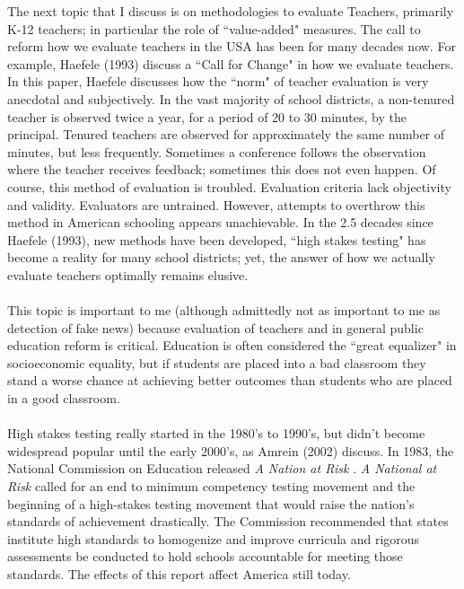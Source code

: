 \documentclass[12pt, final]{article}
\begin{document}
\label{Source 2}
The next topic that I discuss is on methodologies to evaluate Teachers, primarily K-12 teachers; in particular the role of ``value-added" measures. The call to reform how we evaluate teachers in the USA has been for many decades now. For example, Haefele (1993) \cite{Haefele} discuss a ``Call for Change" in how we evaluate teachers. In this paper, Haefele discusses how the ``norm" of teacher evaluation is very anecdotal and subjectively. In the vast majority of school districts, a non-tenured teacher is observed twice a year, for a period of 20 to 30 minutes, by the principal. Tenured teachers are observed for approximately the same number of minutes, but less frequently. Sometimes a conference follows the observation where the teacher receives feedback; sometimes this does not even happen. Of course, this method of evaluation is troubled. Evaluation criteria lack objectivity and validity. Evaluators are untrained. However, attempts to overthrow this method in American schooling appears unachievable. In the 2.5 decades since Haefele (1993), new methods have been developed, ``high stakes testing" has become a reality for many school districts; yet, the answer of how we actually evaluate teachers optimally remains elusive. 
\\
\\
This topic is important to me (although admittedly not as important to me as detection of fake news) because evaluation of teachers and in general public education reform is critical. Education is often considered the ``great equalizer" in socioeconomic equality, but if students are placed into a bad classroom they stand a worse chance at achieving better outcomes than students who are placed in a good classroom.
\\
\\
High stakes testing really started in the 1980's to 1990's, but didn't become widespread popular until the early 2000's, as Amrein (2002) \cite{Amrein} discuss. In 1983, the National Commission on Education released \textit{A Nation at Risk} \cite{National}. \textit{A National at Risk} called for an end to minimum competency testing movement and the beginning of a high-stakes testing movement that would raise the nation's standards of achievement drastically. The Commission recommended that states institute high standards to homogenize and improve curricula and rigorous assessments be conducted to hold schools accountable for meeting those standards. The effects of this report affect America still today.
\\
\end{document}
